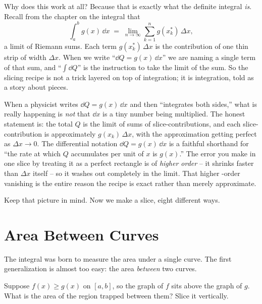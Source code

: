 Why does this work at all? Because that is exactly what the definite integral
\emph{is}. Recall from the chapter on the integral that
\[
  \int_a^b g(x)\,\dd x \;=\; \lim_{n\to\infty}\sum_{k=1}^n g(x_k^*)\,\Delta x,
\]
a limit of Riemann sums. Each term $g(x_k^*)\,\Delta x$ is the contribution of
one thin strip of width $\Delta x$. When we write ``$\dd Q = g(x)\,\dd x$'' we are
naming a single term of that sum, and ``$\int \dd Q$'' is the instruction to take
the limit of the sum. So the slicing recipe is not a trick layered on top of
integration; it is integration, told as a story about pieces.

\begin{happeningbox}
When a physicist writes $\dd Q = g(x)\,\dd x$ and then ``integrates both sides,''
what is really happening is \emph{not} that $\dd x$ is a tiny number being
multiplied. The honest statement is: the total $Q$ is the limit of sums of
slice-contributions, and each slice-contribution is approximately $g(x_k)\,\Delta
x$, with the approximation getting perfect as $\Delta x \to 0$. The differential
notation $\dd Q = g(x)\,\dd x$ is a faithful shorthand for ``the rate at which $Q$
accumulates per unit of $x$ is $g(x)$.'' The error you make in one slice by
treating it as a perfect rectangle is of \emph{higher order} -- it shrinks faster
than $\Delta x$ itself -- so it washes out completely in the limit. That higher
-order vanishing is the entire reason the recipe is exact rather than merely
approximate.
\end{happeningbox}

Keep that picture in mind. Now we make a slice, eight different ways.

\section{Area Between Curves}
\label{ch26:area}

The integral was born to measure the area under a single curve. The first
generalization is almost too easy: the area \emph{between} two curves.

Suppose $f(x) \ge g(x)$ on $[a,b]$, so the graph of $f$ sits above the graph of
$g$. What is the area of the region trapped between them? Slice it vertically.

